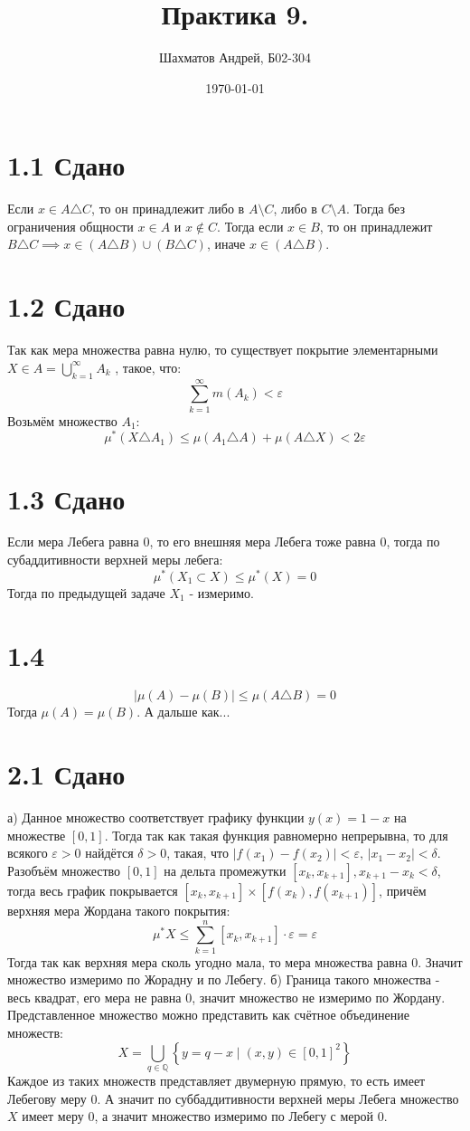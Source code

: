 \documentclass[12pt]{article}
\title{Практика 9.}
\author{Шахматов Андрей, Б02-304}
\date{\today}
\begin{document}
\maketitle
\tableofcontents

\section{1.1 Сдано}
Если $x \in A \triangle C$, то он принадлежит либо в $A \setminus C$, либо в $C \setminus A$. Тогда без ограничения общности 
$x \in A$ и $x \not \in C$. Тогда если $x \in B$, то он принадлежит $B \triangle C \implies x \in (A \triangle B) \cup (B \triangle C)$, иначе 
$x \in (A \triangle B)$.    
\section{1.2 Сдано}
Так как мера множества равна нулю, то существует покрытие элементарными $X \in A = \bigcup_{k=1}^{\infty} A_k$ , такое, что: 
\[
    \sum_{k=1}^{\infty} m(A_k) < \varepsilon
\]  
Возьмём множество $A_1$: 
\[
    \mu^{\ast}(X \triangle A_1) \leq \mu(A_1 \triangle A) + \mu(A \triangle X) < 2\varepsilon 
\]
\section{1.3 Сдано}
Если мера Лебега равна $0$, то его внешняя мера Лебега тоже равна $0$, 
тогда по субаддитивности верхней меры лебега: 
\[
    \mu^{\ast}(X_1 \subset X) \leq \mu^{\ast}(X) = 0
\]   
Тогда по предыдущей задаче $X_1$ - измеримо. 
\section{1.4}
\[
    \left\vert \mu(A) - \mu(B) \right\vert \leq \mu (A \triangle B) = 0
\]
Тогда $\mu(A) = \mu(B)$. А дальше как... 
\section{2.1 Сдано}
а) Данное множество соответствует графику функции $y(x) = 1 - x$ на множестве $[0, 1]$. 
Тогда так как такая функция равномерно непрерывна, то для всякого $\varepsilon > 0$ найдётся $\delta > 0$, 
такая, что $\vert f(x_1) - f(x_2) \vert < \varepsilon, \, \vert x_1 - x_2 \vert  < \delta$. Разобъём 
множество $[0, 1]$ на дельта промежутки $[x_k, x_{k+1}], x_{k+1} - x_k < \delta$, 
тогда весь график покрывается $[x_k, x_{k+1}] \times [f(x_k), f(x_{k+1})]$, причём верхняя мера Жордана 
такого покрытия:
\[
    \mu^{\ast} X \leq \sum_{k=1}^{n} [x_k, x_{k+1}] \cdot \varepsilon = \varepsilon  
\]     
Тогда так как верхняя мера сколь угодно мала, то мера множества равна $0$. Значит множество 
измеримо по Жорадну и по Лебегу. 
б) Граница такого множества - весь квадрат, его мера не равна 0, значит множество не измеримо по Жордану. 
Представленное множество можно представить как счётное объединение множеств: 
\[
    X = \bigcup_{q \in \mathbb{Q}} \left\{ y = q - x \mid (x, y) \in [0, 1]^2 \right\}  
\]
Каждое из таких множеств представляет двумерную прямую, то есть имеет Лебегову меру $0$. А значит 
по суббаддитивности верхней меры Лебега множество $X$ имеет меру $0$, а значит множество измеримо по Лебегу 
с мерой $0$.
\end{document}
